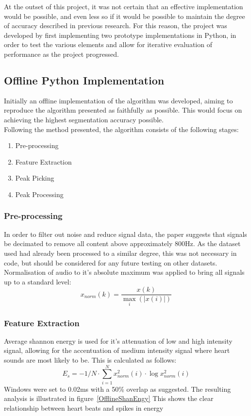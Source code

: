 \documentclass[titlepage]{scrartcl}
\begin{document}
At the outset of this project, it was not certain that an effective
implementation would be possible, and even less so if it would be possible to
maintain the degree of accuracy described in previous research. For this
reason, the project was developed by first implementing two prototype
implementations in Python, in order to test the various elements and allow for
iterative evaluation of performance as the project progressed.

\subsection{Offline Python Implementation}
Initially an offline implementation of the algorithm was developed, aiming to
reproduce the algorithm presented as faithfully as possible. This would focus
on achieving the highest segmentation accuracy possible.\\
Following the method presented, the algorithm consists of the following stages:
\begin{enumerate}
    \item Pre-processing
    \item Feature Extraction
    \item Peak Picking
    \item Peak Processing
\end{enumerate}
\subsubsection{Pre-processing}
In order to filter out noise and reduce signal data, the paper suggests that
signals be decimated to remove all content above approximately 800Hz. As the
dataset used had already been processed to a similar degree, this was not
necessary in code, but should be considered for any future testing on other
datasets.
Normalisation of audio to it's absolute maximum was applied to bring all
signals up to a standard level:
$$
x_{norm}(k) = \frac{x(k)}{\max\limits_{i}(|x(i)|)}
$$
\subsubsection{Feature Extraction}
Average shannon energy is used for it's attenuation of low and high intensity
signal, allowing for the accentuation of medium intensity signal where heart
sounds are most likely to be. This is calculated as follows:
$$
E_s = -1/N\cdot\sum_{i=1}^{N}x^{2}_{norm}(i)\cdot\log x^{2}_{norm}(i)
$$
Windows were set to 0.02ms with a 50\% overlap as suggested.
The resulting analysis is illustrated in figure~\ref{OfflineShanEngy}
This shows the clear relationship between heart beats and spikes in energy
\end{document}
